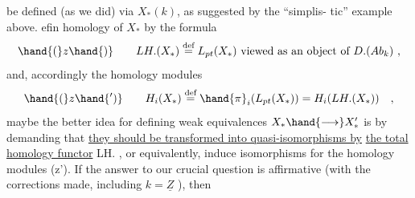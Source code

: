 be defined (as we did) via $X_{*}(k)$, as suggested by the  ``simplis-%
tic'' example above.  efin homology of $X_{*}$ by the formula
\[ \hand{(}z\hand{)} \qquad LH.(X_{*}) \overset{\text{def}}{=} L_{pt}(X_{*}) \text{ viewed as an object of } D.(Ab_{k}) \ , \]
and, accordingly the homology modules
\[ \hand{(}z\hand{')} \qquad H_{i}(X_{*}) \overset{\text{def}}{=} \hand{\pi}_{i}(L_{pt}(X_{*})) = H_{i}(LH.(X_{*})) \quad , \]
maybe the better idea for defining weak equivalences $X_{*} \hand{\longrightarrow} X'_{*}$ is
by demanding that \uline{they should be transformed into quasi-isomorphisms by}
\uline{the total homology functor} LH. , or equivalently, induce isomorphisms
for the homology modules (z'). If the answer to our crucial question
is affirmative (with the corrections made, including $k = \underline{Z}$ ), then


